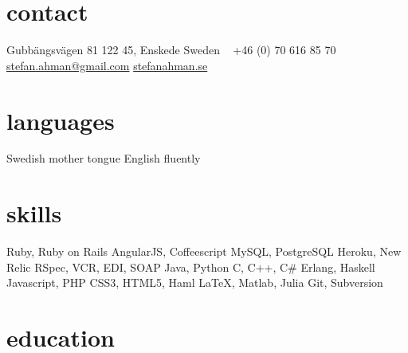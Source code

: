 \documentclass[]{friggeri-cv} %
\begin{document}


\begin{aside} %
\section{contact}
Gubbängsvägen 81
122 45, Enskede
Sweden
~
+46 (0) 70 616 85 70
~
\href{mailto:stefan.ahman@gmail.com}{stefan.ahman@gmail.com}
\href{http://www.stefanahman.se}{stefanahman.se}
\section{languages}
Swedish mother tongue
English fluently
\section{skills}
Ruby, Ruby on Rails
AngularJS, Coffeescript
MySQL, PostgreSQL
Heroku, New Relic
RSpec, VCR,
EDI, SOAP
Java, Python
C, C++, C\#
Erlang, Haskell
Javascript, PHP
CSS3, HTML5, Haml
LaTeX, Matlab, Julia
Git, Subversion
\end{aside}


\section{education}
\end{document}
